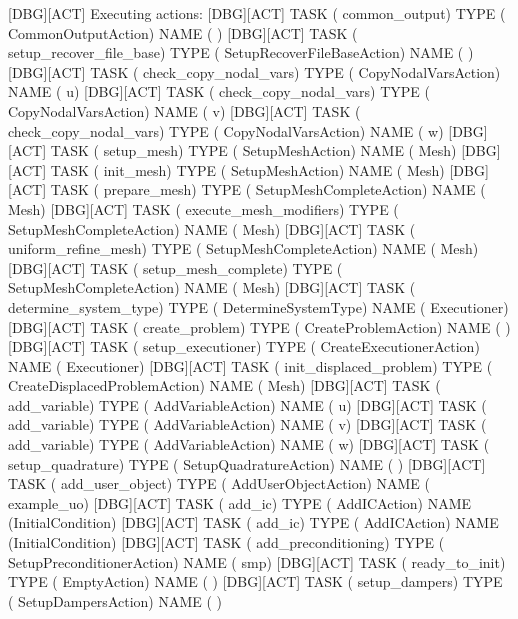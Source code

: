 {[DBG][ACT] Executing actions:
[DBG][ACT] TASK (           common_output) TYPE (              CommonOutputAction) NAME (                )
[DBG][ACT] TASK ( setup_recover_file_base) TYPE (      SetupRecoverFileBaseAction) NAME (                )
[DBG][ACT] TASK (   check_copy_nodal_vars) TYPE (             CopyNodalVarsAction) NAME (               u)
[DBG][ACT] TASK (   check_copy_nodal_vars) TYPE (             CopyNodalVarsAction) NAME (               v)
[DBG][ACT] TASK (   check_copy_nodal_vars) TYPE (             CopyNodalVarsAction) NAME (               w)
[DBG][ACT] TASK (              setup_mesh) TYPE (                 SetupMeshAction) NAME (            Mesh)
[DBG][ACT] TASK (               init_mesh) TYPE (                 SetupMeshAction) NAME (            Mesh)
[DBG][ACT] TASK (            prepare_mesh) TYPE (         SetupMeshCompleteAction) NAME (            Mesh)
[DBG][ACT] TASK (  execute_mesh_modifiers) TYPE (         SetupMeshCompleteAction) NAME (            Mesh)
[DBG][ACT] TASK (     uniform_refine_mesh) TYPE (         SetupMeshCompleteAction) NAME (            Mesh)
[DBG][ACT] TASK (     setup_mesh_complete) TYPE (         SetupMeshCompleteAction) NAME (            Mesh)
[DBG][ACT] TASK (   determine_system_type) TYPE (             DetermineSystemType) NAME (     Executioner)
[DBG][ACT] TASK (          create_problem) TYPE (             CreateProblemAction) NAME (                )
[DBG][ACT] TASK (       setup_executioner) TYPE (         CreateExecutionerAction) NAME (     Executioner)
[DBG][ACT] TASK (  init_displaced_problem) TYPE (    CreateDisplacedProblemAction) NAME (            Mesh)
[DBG][ACT] TASK (            add_variable) TYPE (               AddVariableAction) NAME (               u)
[DBG][ACT] TASK (            add_variable) TYPE (               AddVariableAction) NAME (               v)
[DBG][ACT] TASK (            add_variable) TYPE (               AddVariableAction) NAME (               w)
[DBG][ACT] TASK (        setup_quadrature) TYPE (           SetupQuadratureAction) NAME (                )
[DBG][ACT] TASK (         add_user_object) TYPE (             AddUserObjectAction) NAME (      example_uo)
[DBG][ACT] TASK (                  add_ic) TYPE (                     AddICAction) NAME (InitialCondition)
[DBG][ACT] TASK (                  add_ic) TYPE (                     AddICAction) NAME (InitialCondition)
[DBG][ACT] TASK (     add_preconditioning) TYPE (       SetupPreconditionerAction) NAME (             smp)
[DBG][ACT] TASK (           ready_to_init) TYPE (                     EmptyAction) NAME (                )
[DBG][ACT] TASK (           setup_dampers) TYPE (              SetupDampersAction) NAME (                )
}
